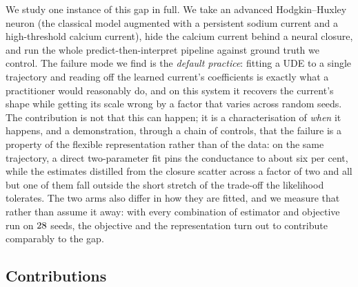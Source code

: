 \documentclass{article}
\begin{document}
We study one instance of this gap in full. We take an advanced Hodgkin--Huxley
neuron (the classical model augmented with a persistent sodium current and a
high-threshold calcium current), hide the calcium current behind a neural
closure, and run the whole predict-then-interpret pipeline against ground truth
we control. The failure mode we find is the \emph{default practice}: fitting a
UDE to a single trajectory and reading off the learned current's coefficients is
exactly what a practitioner would reasonably do, and on this system it recovers
the current's shape while getting its scale wrong by a factor that varies across
random seeds.
The contribution is not that this can happen; it is a characterisation of
\emph{when} it happens, and a demonstration, through a chain of controls, that
the failure is a property of the flexible representation rather than of the data:
on the same trajectory, a direct two-parameter fit
pins the conductance to about six per cent, while the estimates distilled from
the closure scatter across a factor of two and all but one of them fall outside
the short stretch of the trade-off the likelihood tolerates. The two arms also
differ in how they are fitted, and we measure that rather than assume it away:
with every combination of estimator and objective run on $28$ seeds, the
objective and the representation turn out to contribute comparably to the gap.

\subsection{Contributions}
\end{document}

